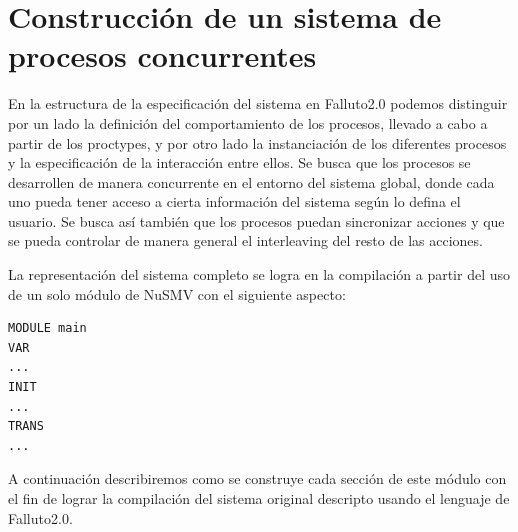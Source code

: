 \documentclass[titlepage, 12pt]{book}
\begin{document}
\section{Construcci\'on de un sistema de procesos concurrentes}
En la estructura de la especificaci\'on del sistema en Falluto2.0 podemos distinguir por un lado la definici\'on del comportamiento de los procesos, llevado a cabo a partir de los proctypes, y por otro lado la instanciaci\'on de los diferentes procesos y la especificaci\'on de la interacci\'on entre ellos. Se busca que los procesos se desarrollen de manera concurrente en el entorno del sistema global, donde cada uno pueda tener acceso a cierta informaci\'on del sistema seg\'un lo defina el usuario. Se busca as\'i tambi\'en que los procesos puedan sincronizar acciones y que se pueda controlar de manera general el interleaving del resto de las acciones.

La representaci\'on del sistema completo se logra en la compilaci\'on a partir del uso de un solo m\'odulo de NuSMV con el siguiente aspecto:
\begin{verbatim}
MODULE main
VAR
...
INIT
...
TRANS
...
\end{verbatim}
A continuaci\'on describiremos como se construye cada secci\'on de este m\'odulo con el fin de lograr la compilaci\'on del sistema original descripto usando el lenguaje de Falluto2.0.
\end{document}
